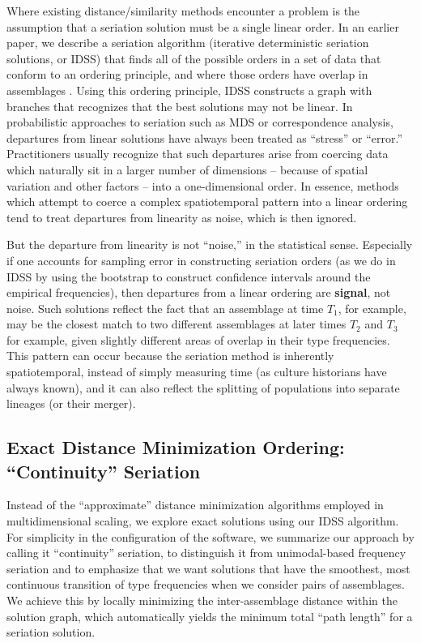 Where existing distance/similarity methods encounter a problem is the
assumption that a seriation solution must be a single linear order. In
an earlier paper, we describe a seriation algorithm (iterative
deterministic seriation solutions, or IDSS) that finds all of the
possible orders in a set of data that conform to an ordering principle,
and where those orders have overlap in assemblages
\citep{lipomadsendunnell2015}. Using this ordering principle, IDSS
constructs a graph with branches that recognizes that the best solutions
may not be linear. In probabilistic approaches to seriation such as MDS
or correspondence analysis, departures from linear solutions have always
been treated as ``stress'' or ``error.'' Practitioners usually recognize
that such departures arise from coercing data which naturally sit in a
larger number of dimensions -- because of spatial variation and other
factors -- into a one-dimensional order. In essence, methods which
attempt to coerce a complex spatiotemporal pattern into a linear
ordering tend to treat departures from linearity as noise, which is then
ignored.

But the departure from linearity is not ``noise,'' in the statistical
sense. Especially if one accounts for sampling error in constructing
seriation orders (as we do in IDSS by using the bootstrap to construct
confidence intervals around the empirical frequencies), then departures
from a linear ordering are \textbf{signal}, not noise. Such solutions
reflect the fact that an assemblage at time \(T_1\), for example, may be
the closest match to two different assemblages at later times \(T_2\)
and \(T_3\) for example, given slightly different areas of overlap in
their type frequencies. This pattern can occur because the seriation
method is inherently spatiotemporal, instead of simply measuring time
(as culture historians have always known), and it can also reflect the
splitting of populations into separate lineages (or their merger).

\subsection{\texorpdfstring{Exact Distance Minimization Ordering:
``Continuity''
Seriation}{Exact Distance Minimization Ordering: Continuity Seriation}}\label{exact-distance-minimization-ordering-continuity-seriation}

Instead of the ``approximate'' distance minimization algorithms employed
in multidimensional scaling, we explore exact solutions using our IDSS
algorithm. For simplicity in the configuration of the software, we
summarize our approach by calling it ``continuity'' seriation, to
distinguish it from unimodal-based frequency seriation and to emphasize
that we want solutions that have the smoothest, most continuous
transition of type frequencies when we consider pairs of assemblages. We
achieve this by locally minimizing the inter-assemblage distance within
the solution graph, which automatically yields the minimum total ``path
length'' for a seriation solution.

